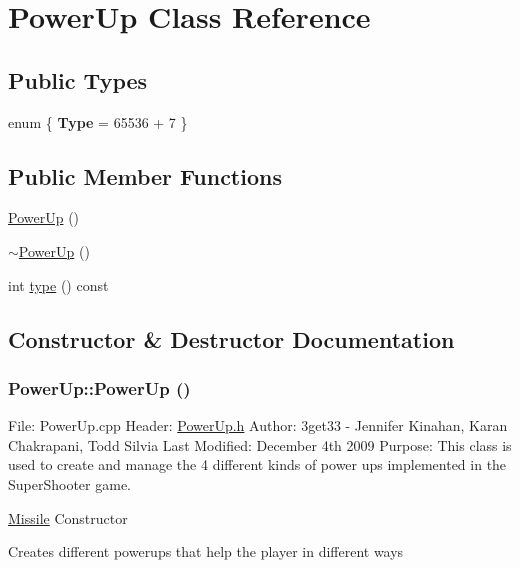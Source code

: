 \hypertarget{class_power_up}{
\section{PowerUp Class Reference}
\label{class_power_up}
}
\subsection*{Public Types}
\begin{DoxyCompactItemize}
\item 
enum \{ {\bfseries Type} =  65536 + 7
 \}
\end{DoxyCompactItemize}
\subsection*{Public Member Functions}
\begin{DoxyCompactItemize}
\item 
\hyperlink{class_power_up_acc2d72c2a913037085eab768bfb3edf7}{PowerUp} ()
\item 
\hyperlink{class_power_up_a353053fe27c5a148a2fcd4f5f45e19af}{$\sim$PowerUp} ()
\item 
int \hyperlink{class_power_up_a8a5992a811184eb348f934d6a07b73c0}{type} () const 
\end{DoxyCompactItemize}


\subsection{Constructor \& Destructor Documentation}
\hypertarget{class_power_up_acc2d72c2a913037085eab768bfb3edf7}{
\subsubsection[{PowerUp}]{\setlength{\rightskip}{0pt plus 5cm}PowerUp::PowerUp ()}}
\label{class_power_up_acc2d72c2a913037085eab768bfb3edf7}
File: PowerUp.cpp Header: \hyperlink{_power_up_8h_source}{PowerUp.h} Author: 3get33 -\/ Jennifer Kinahan, Karan Chakrapani, Todd Silvia Last Modified: December 4th 2009 Purpose: This class is used to create and manage the 4 different kinds of power ups implemented in the SuperShooter game.

\hyperlink{class_missile}{Missile} Constructor

Creates different powerups that help the player in different ways

